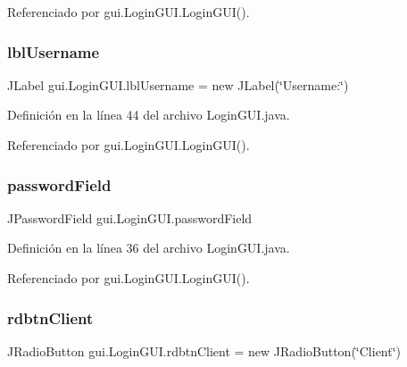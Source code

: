 Referenciado por gui.\+Login\+G\+U\+I.\+Login\+G\+U\+I().

\mbox{\label{classgui_1_1_login_g_u_i_af689de5c353e75b3523c706407a1bdf2}} 
\subsubsection{\texorpdfstring{lblUsername}{lblUsername}}
{\footnotesize\ttfamily J\+Label gui.\+Login\+G\+U\+I.\+lbl\+Username = new J\+Label(\char`\"{}Username\+:\char`\"{})\hspace{0.3cm}{\ttfamily [private]}}



Definición en la línea 44 del archivo Login\+G\+U\+I.\+java.



Referenciado por gui.\+Login\+G\+U\+I.\+Login\+G\+U\+I().

\mbox{\label{classgui_1_1_login_g_u_i_a36a3a8140a1458add6a02dec5c6b4816}} 
\subsubsection{\texorpdfstring{passwordField}{passwordField}}
{\footnotesize\ttfamily J\+Password\+Field gui.\+Login\+G\+U\+I.\+password\+Field\hspace{0.3cm}{\ttfamily [private]}}



Definición en la línea 36 del archivo Login\+G\+U\+I.\+java.



Referenciado por gui.\+Login\+G\+U\+I.\+Login\+G\+U\+I().

\mbox{\label{classgui_1_1_login_g_u_i_a0249903a45a937044e3e40875521b7fd}} 
\subsubsection{\texorpdfstring{rdbtnClient}{rdbtnClient}}
{\footnotesize\ttfamily J\+Radio\+Button gui.\+Login\+G\+U\+I.\+rdbtn\+Client = new J\+Radio\+Button(\char`\"{}Client\char`\"{})\hspace{0.3cm}{\ttfamily [private]}}




